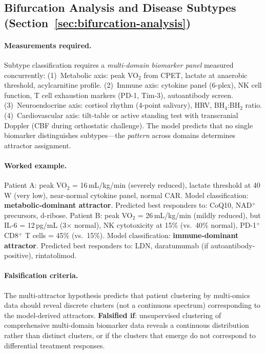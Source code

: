 \subsection{Bifurcation Analysis and Disease Subtypes (Section~\ref{sec:bifurcation-analysis})}

\paragraph{Measurements required.}
Subtype classification requires a \emph{multi-domain biomarker panel} measured concurrently:
(1)~Metabolic axis: peak VO$_2$ from CPET, lactate at anaerobic threshold, acylcarnitine profile.
(2)~Immune axis: cytokine panel (6-plex), NK cell function, T cell exhaustion markers (PD-1, Tim-3), autoantibody screen.
(3)~Neuroendocrine axis: cortisol rhythm (4-point salivary), HRV, BH$_4$:BH$_2$ ratio.
(4)~Cardiovascular axis: tilt-table or active standing test with transcranial Doppler (CBF during orthostatic challenge).
The model predicts that no single biomarker distinguishes subtypes---the \emph{pattern} across domains determines attractor assignment.

\paragraph{Worked example.}
Patient A: peak VO$_2$ = 16\,mL/kg/min (severely reduced), lactate threshold at 40\,W (very low), near-normal cytokine panel, normal CAR. Model classification: \textbf{metabolic-dominant attractor}. Predicted best responders to: CoQ10, NAD$^+$ precursors, d-ribose. Patient B: peak VO$_2$ = 26\,mL/kg/min (mildly reduced), but IL-6 = 12\,pg/mL (3$\times$ normal), NK cytotoxicity at 15\% (vs.\ 40\% normal), PD-1$^+$ CD8$^+$ T cells = 45\% (vs.\ 15\%). Model classification: \textbf{immune-dominant attractor}. Predicted best responders to: LDN, daratumumab (if autoantibody-positive), rintatolimod.

\paragraph{Falsification criteria.}
The multi-attractor hypothesis predicts that patient clustering by multi-omics data should reveal discrete clusters (not a continuous spectrum) corresponding to the model-derived attractors. \textbf{Falsified if}: unsupervised clustering of comprehensive multi-domain biomarker data reveals a continuous distribution rather than distinct clusters, or if the clusters that emerge do not correspond to differential treatment responses.

